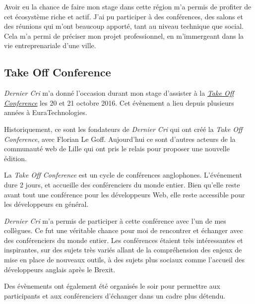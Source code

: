 \documentclass[12pt,a4paper]{article}
\begin{document}
  \bigskip

  Avoir eu la chance de faire mon stage dans cette région m'a permis de
  profiter de cet écosystème riche et actif. J'ai pu participer à des
  conférences, des salons et des réunions qui m'ont beaucoup apporté, tant
  au niveau technique que social. Cela m'a permi de préciser mon projet
  professionnel, en m'immergeant dans la vie entreprenariale d'une ville.

  \bigskip

  \subsection{Take Off Conference}\label{take-off-conference}

  \bigskip

  \emph{Dernier Cri} m'a donné l'occasion durant mon stage d'assister à la
  \href{http://takeoffconf.com/2016}{\emph{Take Off Conference}} les 20 et
  21 octobre 2016. Cet évènement a lieu depuis plusieurs années à
  EuraTechnologies.

  \bigskip

  Historiquement, ce sont les fondateurs de \emph{Dernier Cri} qui ont
  créé la \emph{Take Off Conference}, avec Florian Le Goff. Aujourd'hui ce
  sont d'autres acteurs de la communauté web de Lille qui ont pris le
  relais pour proposer une nouvelle édition.

  \bigskip

  La \emph{Take Off Conference} est un cycle de conférences anglophones.
  L'événement dure 2 jours, et accueille des conférenciers du monde
  entier. Bien qu'elle reste avant tout une conférence pour les
  développeurs Web, elle reste accessible pour les développeurs en
  général.

  \bigskip

  \emph{Dernier Cri} m'a permis de participer à cette conférence avec l'un
  de mes collègues. Ce fut une véritable chance pour moi de rencontrer et
  échanger avec des conférenciers du monde entier. Les conférences étaient
  très intéressantes et inspirantes, sur des sujets très variés allant de
  la compréhension des enjeux de mise en place de nouveaux outils, à des
  sujets plus sociaux comme l'accueil des développeurs anglais après le
  Brexit.

  \bigskip

  Des évènements ont également été organisés le soir pour permettre aux
  participants et aux conférenciers d'échanger dans un cadre plus détendu.
\end{document}
